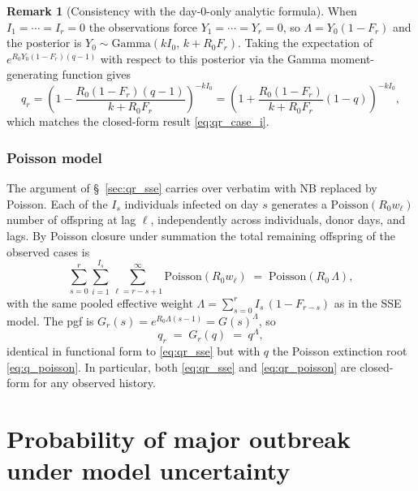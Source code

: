 \documentclass{article}
\theoremstyle{definition}
\newtheorem*{remark}{Remark}
\begin{document}
\begin{remark}[Consistency with the day-0-only analytic formula]
  When $I_1 = \cdots = I_r = 0$ the observations force $Y_1 = \cdots = Y_r =
  0$, so $\Lambda = Y_0(1-F_r)$ and the posterior is
  $Y_0 \sim \mathrm{Gamma}(kI_0,\,k+R_0 F_r)$.  Taking the expectation of
  $e^{R_0 Y_0(1-F_r)(q-1)}$ with respect to this posterior via the Gamma
  moment-generating function gives
  \[
    q_r
    = \left(1 - \frac{R_0(1-F_r)(q-1)}{k+R_0 F_r}\right)^{-kI_0}
    = \left(1 + \frac{R_0(1-F_r)}{k+R_0 F_r}(1-q)\right)^{-kI_0},
  \]
  which matches the closed-form result \eqref{eq:qr_case_i}.
\end{remark}

\subsubsection{Poisson model}
\label{sec:qr_poisson}

The argument of \S~\ref{sec:qr_sse} carries over verbatim with NB
replaced by Poisson.  Each of the $I_s$ individuals infected on day $s$
generates a $\mathrm{Poisson}(R_0 w_\ell)$ number of offspring at lag
$\ell$, independently across individuals, donor days, and lags.  By
Poisson closure under summation the total remaining offspring of the
observed cases is
\begin{equation}
  \sum_{s=0}^{r} \sum_{i=1}^{I_s} \sum_{\ell = r-s+1}^{\infty}
  \mathrm{Poisson}(R_0 w_\ell)
  \;=\;
  \mathrm{Poisson}\!\left(R_0\,\Lambda\right),
\end{equation}
with the same pooled effective weight
$\Lambda = \sum_{s=0}^{r} I_s\,(1 - F_{r-s})$ as in the SSE model.  The
pgf is $G_r(s) = e^{R_0\Lambda(s-1)} = G(s)^{\Lambda}$, so
\begin{equation}\label{eq:qr_poisson}
  q_r \;=\; G_r(q) \;=\; q^{\Lambda},
\end{equation}
identical in functional form to \eqref{eq:qr_sse} but with $q$ the
Poisson extinction root \eqref{eq:q_poisson}.  In particular, both
\eqref{eq:qr_sse} and \eqref{eq:qr_poisson} are closed-form for any
observed history.

\section{Probability of major outbreak under model uncertainty}
\label{sec:pmo_uncertain}
\end{document}
